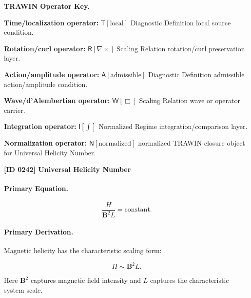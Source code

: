 \par\vspace{0.45\baselineskip}
\noindent\begin{minipage}[t]{\linewidth}
\begingroup
\small
\raggedright
\textbf{TRAWIN Operator Key.}\par
\noindent\textbf{Time/localization operator:} $\mathsf{T}\!\left[\mathrm{local}\right]$ Diagnostic Definition local source condition.\par
\noindent\textbf{Rotation/curl operator:} $\mathsf{R}\!\left[\nabla\times\right]$ Scaling Relation rotation/curl preservation layer.\par
\noindent\textbf{Action/amplitude operator:} $\mathsf{A}\!\left[\mathrm{admissible}\right]$ Diagnostic Definition admissible action/amplitude condition.\par
\noindent\textbf{Wave/d'Alembertian operator:} $\mathsf{W}\!\left[\Box\right]$ Scaling Relation wave or operator carrier.\par
\noindent\textbf{Integration operator:} $\mathsf{I}\!\left[\int\right]$ Normalized Regime integration/comparison layer.\par
\noindent\textbf{Normalization operator:} $\mathsf{N}\!\left[\mathrm{normalized}\right]$ normalized TRAWIN closure object for Universal Helicity Number.\par
\endgroup
\end{minipage}

\clearpage
\noindent\textbf{[ID 0242] Universal Helicity Number}\par
\vspace{0.35em}
\paragraph{Primary Equation.}
\begin{equation}
\frac{H}{\mathbf{B}^2 L}
=
\mathrm{constant}.
\end{equation}

\paragraph{Primary Derivation.}
Magnetic helicity has the characteristic scaling form:

\begin{equation}
H
\sim
\mathbf{B}^2 L .
\end{equation}

Here $\mathbf{B}^2$ captures magnetic field intensity and $L$ captures the characteristic system scale.

